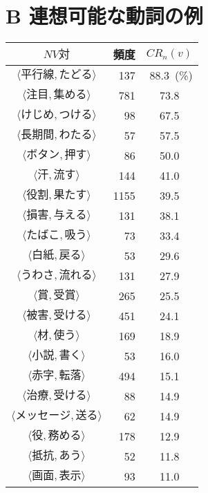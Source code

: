 \section*{B 連想可能な動詞の例} \label{b}
\begin{center}
\begin{tabular}{|crc|}
\hline
$NV対$ & 頻度 & $CR_{n}(v)$\\
\hline \hline
$\langle 平行線,たどる\rangle$& 137 &\multicolumn{1}{r|}{88.3\ (\%)}\\
$\langle 注目,集める\rangle$ & 781 & 73.8\\
$\langle けじめ,つける\rangle$ & 98 & 67.5\\
$\langle 長期間,わたる \rangle$& 57 & 57.5\\
$\langle ボタン,押す\rangle$ & 86 & 50.0\\
$\langle 汗,流す\rangle$ & 144 & 41.0\\
$\langle 役割,果たす\rangle$ & 1155 & 39.5\\
$\langle 損害,与える\rangle$ & 131 & 38.1\\
$\langle たばこ,吸う\rangle$ & 73 & 33.4\\
$\langle 白紙,戻る\rangle$ & 53 & 29.6\\
$\langle うわさ,流れる\rangle$ & 131 & 27.9\\
$\langle 賞,受賞\rangle$   & 265 & 25.5\\
$\langle 被害,受ける\rangle$ & 451 & 24.1\\
$\langle 材,使う\rangle$ & 169 & 18.9\\
$\langle 小説,書く\rangle$ & 53 & 16.0\\
$\langle 赤字,転落\rangle$ & 494 & 15.1\\
$\langle 治療,受ける\rangle$ & 88 & 14.9\\
$\langle メッセージ,送る\rangle$ & 62 & 14.9\\
$\langle 役,務める\rangle$ & 178 & 12.9\\
$\langle 抵抗,あう\rangle$ & 52 & 11.8\\
$\langle 画面,表示\rangle$ & 93 & 11.0\\
\hline
\end{tabular}
\end{center}



